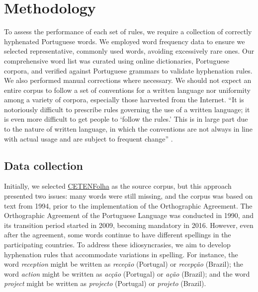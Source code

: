 \section{Methodology}\label{sec-methodology}

To assess the performance of each set of rules, we require a collection of
correctly hyphenated Portuguese words. We employed word frequency data to
ensure we selected representative, commonly used words, avoiding excessively
rare ones. Our comprehensive word list was curated using online dictionaries,
Portuguese corpora, and verified against Portuguese grammars to validate
hyphenation rules. We also performed manual corrections where necessary.
We should not expect an entire corpus to follow a set of conventions for a written 
language nor uniformity among a variety of corpora, especially those harvested from the Internet.
``It is notoriously difficult to prescribe rules governing the use of a written language; it is even more difficult
to get people to `follow the rules.' This is in large part due to the nature of written language, in which
the conventions are not always in line with actual usage and are subject to frequent change'' \parencite[p.~14]{palmer2010}.



\subsection{Data collection}\label{sec-data-coll}

Initially, we selected
\href{https://www.linguateca.pt/cetenfolha/index_info.html}{CETENFolha}
as the source corpus, but this approach presented two issues: many
words were still missing, and the corpus was based on text from 1994, prior to
the implementation of the Orthographic Agreement. The Orthographic Agreement
of the Portuguese Language was conducted in 1990, and its transition period
started in 2009, becoming mandatory in 2016. However, even after the agreement,
some words continue to have different spellings in the participating countries.
To address these idiosyncrasies, we aim to develop hyphenation rules that
accommodate variations in spelling. For instance, the word \emph{reception}
might be written as \emph{receção} (Portugal) or \emph{recepção} (Brazil); the
word \emph{action} might be written as \emph{acção} (Portugal) or \emph{ação}
(Brazil); and the word \emph{project} might be written as \emph{projecto}
(Portugal) or \emph{projeto} (Brazil).


